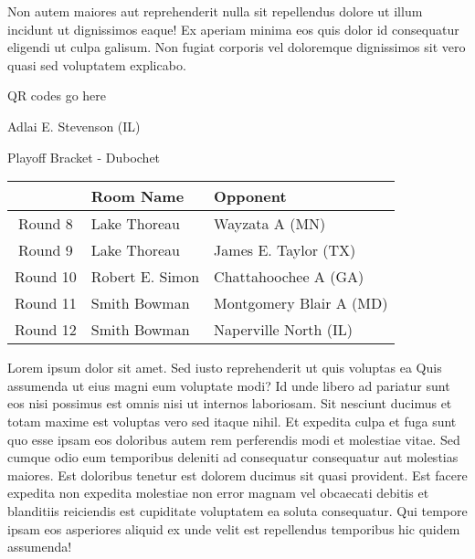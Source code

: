 \documentclass{article}%
\begin{document}
\newline%
Non autem maiores aut reprehenderit nulla sit repellendus dolore ut illum incidunt ut dignissimos eaque! Ex aperiam minima eos quis dolor id consequatur eligendi ut culpa galisum. Non fugiat corporis vel doloremque dignissimos sit vero quasi sed voluptatem explicabo.\newline%
\newline%
%
\vspace*{30pt}%
\begin{center}%
\begin{Huge}%
QR codes go here%
\end{Huge}%
\end{center}%
\newpage%
\begin{center}%
\begin{Huge}%
Adlai E. Stevenson (IL)%
\end{Huge}%
\vspace*{8pt}%
\linebreak%
\begin{Large}%
Playoff Bracket {-} Dubochet%
\end{Large}%
\end{center}%
\begin{tabularx}{\textwidth}{|c|Y|Y|}%
\hline%
&Room Name&Opponent\\%
\hline%
Round 8&Lake Thoreau&Wayzata A (MN)\\%
Round 9&Lake Thoreau&James E. Taylor (TX)\\%
Round 10&Robert E. Simon&Chattahoochee A (GA)\\%
Round 11&Smith Bowman&Montgomery Blair A (MD)\\%
Round 12&Smith Bowman&Naperville North (IL)\\%
\hline%
\end{tabularx}%
\vspace*{8pt}%
\linebreak%
\newline%
\newline%
Lorem ipsum dolor sit amet. Sed iusto reprehenderit ut quis voluptas ea Quis assumenda ut eius magni eum voluptate modi? Id unde libero ad pariatur sunt eos nisi possimus est omnis nisi ut internos laboriosam. Sit nesciunt ducimus et totam maxime est voluptas vero sed itaque nihil. Et expedita culpa et fuga sunt quo esse ipsam eos doloribus autem rem perferendis modi et molestiae vitae.\newline%
\newline%
Sed cumque odio eum temporibus deleniti ad consequatur consequatur aut molestias maiores. Est doloribus tenetur est dolorem ducimus sit quasi provident. Est facere expedita non expedita molestiae non error magnam vel obcaecati debitis et blanditiis reiciendis est cupiditate voluptatem ea soluta consequatur. Qui tempore ipsam eos asperiores aliquid ex unde velit est repellendus temporibus hic quidem assumenda!\newline%
\end{document}
